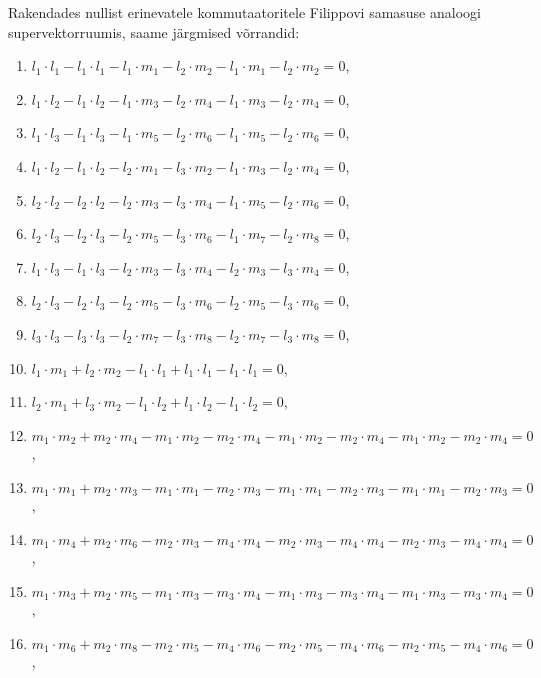 Rakendades nullist erinevatele kommutaatoritele Filippovi samasuse analoogi
supervektorruumis, saame järgmised võrrandid:
\begin{enumerate}
    \item $l_1 \cdot l_1 - l_1 \cdot l_1 - l_1 \cdot m_1 - l_2 \cdot m_2 - l_1 \cdot m_1 - l_2 \cdot m_2 = 0$,
    \item $l_1 \cdot l_2 - l_1 \cdot l_2 - l_1 \cdot m_3 - l_2 \cdot m_4 - l_1 \cdot m_3 - l_2 \cdot m_4 = 0$,
    \item $l_1 \cdot l_3 - l_1 \cdot l_3 - l_1 \cdot m_5 - l_2 \cdot m_6 - l_1 \cdot m_5 - l_2 \cdot m_6 = 0$,
    \item $l_1 \cdot l_2 - l_1 \cdot l_2 - l_2 \cdot m_1 - l_3 \cdot m_2 - l_1 \cdot m_3 - l_2 \cdot m_4 = 0$,
    \item $l_2 \cdot l_2 - l_2 \cdot l_2 - l_2 \cdot m_3 - l_3 \cdot m_4 - l_1 \cdot m_5 - l_2 \cdot m_6 = 0$,
    \item $l_2 \cdot l_3 - l_2 \cdot l_3 - l_2 \cdot m_5 - l_3 \cdot m_6 - l_1 \cdot m_7 - l_2 \cdot m_8 = 0$,
    \item $l_1 \cdot l_3 - l_1 \cdot l_3 - l_2 \cdot m_3 - l_3 \cdot m_4 - l_2 \cdot m_3 - l_3 \cdot m_4 = 0$,
    \item $l_2 \cdot l_3 - l_2 \cdot l_3 - l_2 \cdot m_5 - l_3 \cdot m_6 - l_2 \cdot m_5 - l_3 \cdot m_6 = 0$,
    \item $l_3 \cdot l_3 - l_3 \cdot l_3 - l_2 \cdot m_7 - l_3 \cdot m_8 - l_2 \cdot m_7 - l_3 \cdot m_8 = 0$,
    \item $l_1 \cdot m_1 + l_2 \cdot m_2 - l_1 \cdot l_1 + l_1 \cdot l_1 - l_1 \cdot l_1 = 0$,
    \item $l_2 \cdot m_1 + l_3 \cdot m_2 - l_1 \cdot l_2 + l_1 \cdot l_2 - l_1 \cdot l_2 = 0$,
    \item $m_1 \cdot m_2 + m_2 \cdot m_4 - m_1 \cdot m_2 - m_2 \cdot m_4 - m_1 \cdot m_2 - m_2 \cdot m_4 - m_1 \cdot m_2 - m_2 \cdot m_4 = 0$,
    \item $m_1 \cdot m_1 + m_2 \cdot m_3 - m_1 \cdot m_1 - m_2 \cdot m_3 - m_1 \cdot m_1 - m_2 \cdot m_3 - m_1 \cdot m_1 - m_2 \cdot m_3 = 0$,
    \item $m_1 \cdot m_4 + m_2 \cdot m_6 - m_2 \cdot m_3 - m_4 \cdot m_4 - m_2 \cdot m_3 - m_4 \cdot m_4 - m_2 \cdot m_3 - m_4 \cdot m_4 = 0$,
    \item $m_1 \cdot m_3 + m_2 \cdot m_5 - m_1 \cdot m_3 - m_3 \cdot m_4 - m_1 \cdot m_3 - m_3 \cdot m_4 - m_1 \cdot m_3 - m_3 \cdot m_4 = 0$,
    \item $m_1 \cdot m_6 + m_2 \cdot m_8 - m_2 \cdot m_5 - m_4 \cdot m_6 - m_2 \cdot m_5 - m_4 \cdot m_6 - m_2 \cdot m_5 - m_4 \cdot m_6 = 0$,

\end{enumerate}

